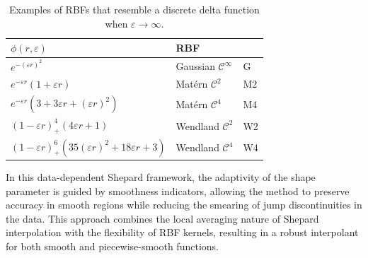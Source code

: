 \documentclass[preprint]{elsarticle}       %
\begin{document}
\begin{table}[h!]
\centering
\begin{tabular}{lll}
\hline
$\phi(r,\varepsilon)$& RBF &                                                          \\ \hline
$e^{-  (\varepsilon r)^2}$ & Gaussian $\mathcal{C}^\infty$ & G                                          \\
$e^{-  \varepsilon r} \left( 1 +   \varepsilon r \right)$ & Mat\'ern $\mathcal{C}^2$ & M2 \\
$e^{-  \varepsilon r} \left( 3 + 3  \varepsilon r +   (\varepsilon r)^2 \right)$ & Mat\'ern $\mathcal{C}^4$ & M4 \\
$(1 -  \varepsilon r)^4_+ \left( 4 \varepsilon r + 1 \right)$ & Wendland $\mathcal{C}^2$ & W2 \\
$(1 -  \varepsilon r)^6_+ \left( 35 (\varepsilon r)^2 + 18 \varepsilon r + 3 \right)$ & Wendland $\mathcal{C}^4$ & W4 \\ \hline
\end{tabular}
\caption{Examples of RBFs that resemble a discrete delta function when $\varepsilon\to\infty$.}\label{tabla1nucleos}
\end{table}
In this data-dependent Shepard framework, the adaptivity of the shape parameter is guided by smoothness indicators, allowing the method to preserve accuracy in smooth regions while reducing the smearing of jump discontinuities in the data. This approach combines the local averaging nature of Shepard interpolation with the flexibility of RBF kernels, resulting in a robust interpolant for both smooth and piecewise-smooth functions.
\end{document}

